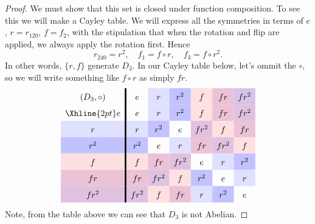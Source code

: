 \documentclass{ximera}
\begin{document}
\begin{example}
\begin{proof}
    We must show that this set is closed under function composition.
    To see this we will make a Cayley table. We will express all the
    symmetries in terms of $e$, $r=r_{120}$, $f=f_2$, with the
    stipulation that when the rotation and flip are applied, we always
    apply the rotation first. Hence
    \[
    r_{240} = r^2, \quad  f_1 = f\circ r, \quad  f_3 = f\circ r^2.
    \]
    In other words, $\{r,f\}$ generate $D_3$.  In our Cayley table
    below, let's ommit the $\circ$, so we will write something like
    $f\circ r$ as simply $fr$.
    \[
    \renewcommand{\arraystretch}{1.6}
    \begin{array}{c!{\vline width 2pt}cccccc}
      (D_3,\circ)& e     & r\cellcolor{blue!12!white}     & r^2\cellcolor{blue!24!white}   & f \cellcolor{red!12!white}    & f r \cellcolor{blue!33!red!24!white}  & f r^2\cellcolor{blue!66!red!24!white} \\  \Xhline{2pt}
      e          & e     & r\cellcolor{blue!12!white}    & r^2\cellcolor{blue!24!white}   & f \cellcolor{red!12!white}    & f r \cellcolor{blue!33!red!24!white}   & f r^2\cellcolor{blue!50!red!24!white} \\  
      r\cellcolor{blue!12!white}         & r\cellcolor{blue!12!white}    & r^2\cellcolor{blue!24!white}   & e     & f r^2\cellcolor{blue!50!red!24!white} & f \cellcolor{red!12!white}    & f r \cellcolor{blue!33!red!24!white}   \\  
      r^2\cellcolor{blue!24!white}        & r^2\cellcolor{blue!24!white}   & e     & r\cellcolor{blue!12!white}    & f r \cellcolor{blue!33!red!24!white}   & f r^2\cellcolor{blue!50!red!24!white} & f \cellcolor{red!12!white}    \\  
      f \cellcolor{red!12!white}         & f \cellcolor{red!12!white}    & f r \cellcolor{blue!33!red!24!white}   & f r^2\cellcolor{blue!50!red!24!white} & e     & r\cellcolor{blue!12!white}    & r^2\cellcolor{blue!24!white}   \\  
      f r \cellcolor{blue!33!red!24!white}        & f r \cellcolor{blue!33!red!24!white}   & f r^2\cellcolor{blue!50!red!24!white} & f \cellcolor{red!12!white}    & r^2\cellcolor{blue!24!white}   & e     & r\cellcolor{blue!12!white}    \\  
      f r^2\cellcolor{blue!50!red!24!white}      & f r^2\cellcolor{blue!50!red!24!white} & f \cellcolor{red!12!white}    & f r \cellcolor{blue!33!red!24!white}   & r\cellcolor{blue!12!white}    & r^2\cellcolor{blue!24!white}   & e     \\  
    \end{array}
    \]
    Note, from the table above we can see that $D_3$ is not Abelian.
  \end{proof}
\end{example}
\end{document}
